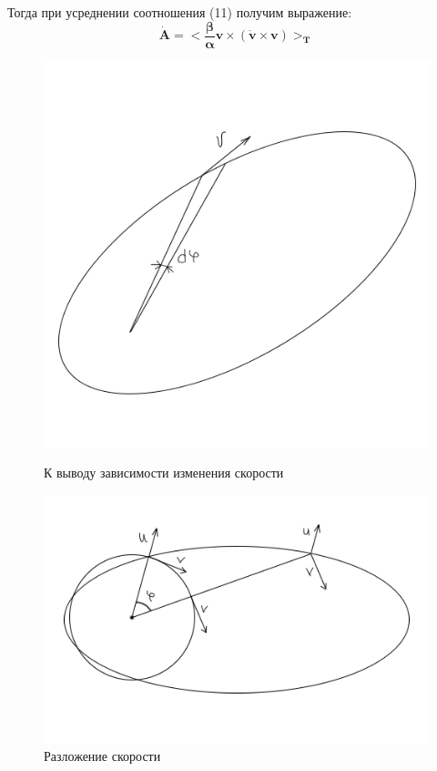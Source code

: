 \documentclass[12pt]{article}
\begin{document}
  Тогда при усреднении соотношения (11) получим выражение:
  \begin{equation}
  	\mathbf{
  		\dot{A} = \Big<\frac{\beta}{\alpha} v\times(\dot{v}\times v)\Big>_T
  	}
  \end{equation}
  
	
  \begin{figure}[h]
  	\begin{center}
  		\begin{minipage}[h]{0.4\linewidth}
  			\includegraphics[scale=0.5]{ellips.png}
  			\caption{К выводу зависимости изменения скорости} %
  		\end{minipage}
  		\hfill
  		\begin{minipage}[h]{0.4\linewidth}
  			\includegraphics[scale=0.5]{velocity.png}
  			\caption{Разложение скорости}
  		\end{minipage}
  	\end{center}
  \end{figure}
\end{document}
